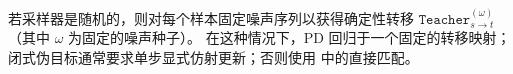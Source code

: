 若采样器是随机的，则对每个样本固定噪声序列以获得确定性转移
$\mathtt{Teacher}^{(\omega)}_{s\to t}$（其中 $\omega$ 为固定的噪声种子）。
在这种情况下，PD 回归于一个固定的转移映射；闭式伪目标通常要求单步显式仿射更新；否则使用  中的直接匹配。













